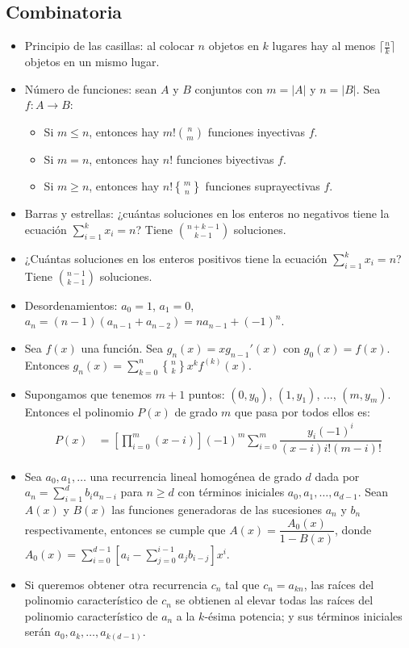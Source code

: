 \documentclass[11pt]{article}
\newcommand{\abs}[1]{\left\lvert #1 \right\lvert}
\newcommand{\genstirlingII}[3]{%
	\genfrac{\{}{\}}{0pt}{#1}{#2}{#3}%
}
\newcommand{\stirlingII}[2]{\genstirlingII{}{#1}{#2}}
\begin{document}
		\subsection{Combinatoria}
			\begin{itemize}
				\item Principio de las casillas: al colocar $n$ objetos en $k$ lugares hay al menos $\lceil \frac{n}{k} \rceil$ objetos en un mismo lugar.
				\item Número de funciones: sean $A$ y $B$ conjuntos con $m=\abs{A}$ y $n=\abs{B}$. Sea $f : A \to B$:
				\begin{itemize}
					\item Si $m \leq n$, entonces hay $\displaystyle m!\binom{n}{m}$ funciones inyectivas $f$.
					\item Si $m=n$, entonces hay $n!$ funciones biyectivas $f$.
					\item Si $m \geq n$, entonces hay $n!\stirlingII{m}{n}$ funciones suprayectivas $f$.
				\end{itemize}
				\item Barras y estrellas: ¿cuántas soluciones en los enteros no negativos tiene la ecuación $\displaystyle \sum_{i=1}^{k}x_i = n$? Tiene  $\displaystyle \binom{n+k-1}{k-1}$ soluciones.
				\item ¿Cuántas soluciones en los enteros positivos tiene la ecuación $\displaystyle \sum_{i=1}^{k}x_i = n$? Tiene  $\displaystyle \binom{n-1}{k-1}$ soluciones.
				\item Desordenamientos: $a_0=1$, $a_1=0$, $a_n=(n-1)(a_{n-1}+a_{n-2})=na_{n-1}+(-1)^n$.
				\item Sea $f(x)$ una función. Sea $g_n(x)=x g_{n-1}'(x)$ con $g_0(x)=f(x)$. Entonces $g_n(x)=\sum_{k=0}^{n} \stirlingII{n}{k} x^k f^{(k)}(x)$.
				\item Supongamos que tenemos $m+1$ puntos: $(0, y_0)$, $(1, y_1)$, $\ldots$, $(m, y_m)$. Entonces el polinomio $P(x)$ de grado $m$ que pasa por todos ellos es:
				\begin{align*}
					P(x) &= \left[ \prod_{i=0}^{m}(x-i) \right] (-1)^m \sum_{i=0}^{m} \dfrac{y_i (-1)^i}{(x-i)i!(m-i)!}
				\end{align*}
				\item Sea $a_0, a_1, \ldots$ una recurrencia lineal homogénea de grado $d$ dada por $\displaystyle a_n=\sum_{i=1}^{d} b_i a_{n-i}$ para $n \geq d$ con términos iniciales $a_0, a_1, \ldots, a_{d-1}$. Sean $A(x)$ y $B(x)$ las funciones generadoras de las sucesiones $a_n$ y $b_n$ respectivamente, entonces se cumple que $A(x)=\dfrac{A_0(x)}{1-B(x)}$, donde $\displaystyle A_0(x)=\sum_{i=0}^{d-1} \left[ a_i - \sum_{j=0}^{i-1}a_j b_{i-j} \right] x^i$.
				\item Si queremos obtener otra recurrencia $c_n$ tal que $c_n=a_{kn}$, las raíces del polinomio característico de $c_n$ se obtienen al elevar todas las raíces del polinomio característico de $a_n$ a la $k$-ésima potencia; y sus términos iniciales serán $a_0, a_k, \ldots, a_{k(d-1)}$.
			\end{itemize}
	
\end{document}
